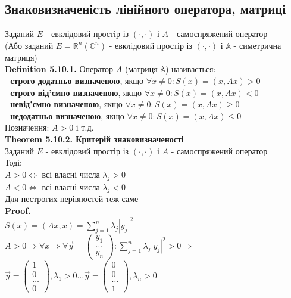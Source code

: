 \documentclass[a4paper, 14pt]{extarticle}
\def\huge{\displaystyle}
\def\defin#1{\textbf{Definition {#1}}}
\def\th#1{\textbf{Theorem {#1}}}
\def\proof{\textbf{Proof.}\\}
\def\bigline{\vspace{5mm}\\}
\begin{document}
\subsection{Знаковизначеність лінійного оператора, матриці}
Заданий $E$ - евклідовий простір із $(\cdot,\cdot)$ і $A$ - самоспряжений оператор\\
(Або заданий $E = \mathbb{R}^n (\mathbb{C}^n)$ - евклідовий простір із $(\cdot,\cdot)$ і $\mathbb{A}$ - симетрична матриця)\\
\defin{5.10.1.} Оператор $A$ (матриця $\mathbb{A}$) називається:\\
- \textbf{строго додатньо визначеною}, якщо $\forall x \neq 0: S(x) = (x,Ax) > 0$\\
- \textbf{строго від'ємно визначеною}, якщо $\forall x \neq 0: S(x) = (x,Ax) < 0$\\
- \textbf{невід'ємно визначеною}, якщо $\forall x \neq 0: S(x) = (x,Ax) \geq 0$\\
- \textbf{недодатньо визначеною}, якщо $\forall x \neq 0: S(x) = (x,Ax) \leq 0$\\
Позначення: $A > 0$ і т.д.
\bigline
\th{5.10.2. Критерій знаковизначеності}\\
Заданий $E$ - евклідовий простір із $(\cdot,\cdot)$ і $A$ - самоспряжений оператор\\
Тоді:\\
$A > 0 \iff$ всі власні числа $\lambda_j > 0$\\
$A < 0 \iff$ всі власні числа $\lambda_j < 0$\\
Для нестрогих нерівностей теж саме\\
\proof
$S(x) = (Ax,x) = \huge \sum_{j=1}^n \lambda_j |y_j|^2$\\
$A > 0 \Rightarrow \forall x \Rightarrow \forall \vec{y} = \begin{pmatrix}
y_1 \\ \dots \\ y_n
\end{pmatrix}: \huge \sum_{j=1}^n \lambda_j |y_j|^2 > 0 \Rightarrow$\\
$\vec{y} = \begin{pmatrix}
1 \\ 0 \\ \dots \\ 0
\end{pmatrix}, \lambda_1 > 0 \dots \vec{y} = \begin{pmatrix}
0 \\ 0 \\ \dots \\ 1
\end{pmatrix}, \lambda_n > 0$\\
\end{document}
